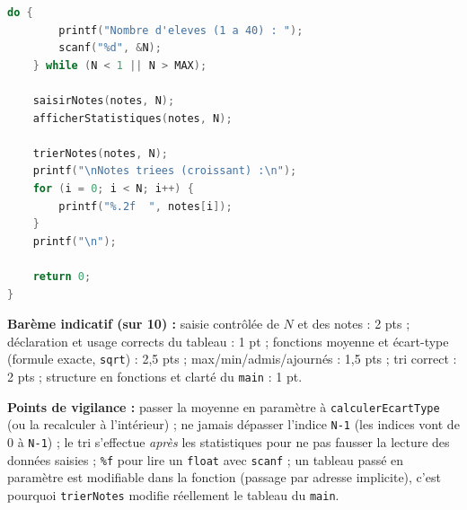 \documentclass[11pt]{article}
\begin{document}
\begin{corrige}
\begin{lstlisting}[language=C]
    do {
        printf("Nombre d'eleves (1 a 40) : ");
        scanf("%d", &N);
    } while (N < 1 || N > MAX);

    saisirNotes(notes, N);
    afficherStatistiques(notes, N);

    trierNotes(notes, N);
    printf("\nNotes triees (croissant) :\n");
    for (i = 0; i < N; i++) {
        printf("%.2f  ", notes[i]);
    }
    printf("\n");

    return 0;
}
\end{lstlisting}

\textbf{Barème indicatif (sur 10) :} saisie contrôlée de $N$ et des notes : 2 pts ; déclaration et usage corrects du tableau : 1 pt ; fonctions moyenne et écart-type (formule exacte, \texttt{sqrt}) : 2,5 pts ; max/min/admis/ajournés : 1,5 pts ; tri correct : 2 pts ; structure en fonctions et clarté du \texttt{main} : 1 pt.

\textbf{Points de vigilance :} passer la moyenne en paramètre à \texttt{calculerEcartType} (ou la recalculer à l'intérieur) ; ne jamais dépasser l'indice \texttt{N-1} (les indices vont de 0 à \texttt{N-1}) ; le tri s'effectue \emph{après} les statistiques pour ne pas fausser la lecture des données saisies ; \texttt{\%f} pour lire un \texttt{float} avec \texttt{scanf} ; un tableau passé en paramètre est modifiable dans la fonction (passage par adresse implicite), c'est pourquoi \texttt{trierNotes} modifie réellement le tableau du \texttt{main}.
\end{corrige}
\end{document}
